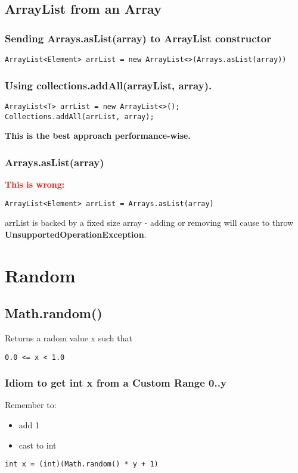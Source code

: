 \documentclass{report}
\begin{document}
\section{ArrayList from an Array}
\subsection{Sending Arrays.asList(array) to ArrayList constructor}
\begin{verbatim}
ArrayList<Element> arrList = new ArrayList<>(Arrays.asList(array))
\end{verbatim}

\subsection{Using collections.addAll(arrayList, array).}
\begin{verbatim}
ArrayList<T> arrList = new ArrayList<>();
Collections.addAll(arrList, array);
\end{verbatim}
\textbf{This is the best approach performance-wise.}

\subsection{Arrays.asList(array)}
\textbf{\textcolor{red}{This is wrong:}}
\begin{verbatim}
ArrayList<Element> arrList = Arrays.asList(array)
\end{verbatim}

arrList is backed by a fixed size array - adding or removing will cause to throw \textbf{UnsupportedOperationException}.

\chapter{Random}
\section{Math.random()}
Returns a radom value x such that
\begin{verbatim}
0.0 <= x < 1.0
\end{verbatim}

\subsection*{Idiom to get int x from a Custom Range 0..y}
Remember to:
\begin{itemize}
	\item add 1
	\item cast to int
\end{itemize}
\begin{verbatim}
int x = (int)(Math.random() * y + 1)
\end{verbatim}
\end{document}
